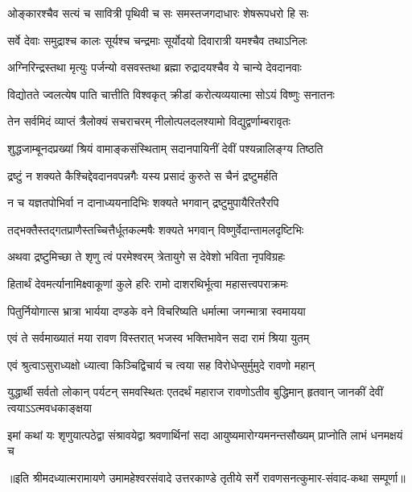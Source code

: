 \twolineshloka
{ओङ्कारश्चैव सत्यं च सावित्री पृथिवी च सः}
{समस्तजगदाधारः शेषरूपधरो हि सः} %

\twolineshloka
{सर्वे देवाः समुद्राश्च कालः सूर्यश्च चन्द्रमाः}
{सूर्योदयो दिवारात्री यमश्चैव तथाऽनिलः} %

\twolineshloka
{अग्निरिन्द्रस्तथा मृत्युः पर्जन्यो वसवस्तथा}
{ब्रह्मा रुद्रादयश्चैव ये चान्ये देवदानवाः} %

\twolineshloka
{विद्योतते ज्वलत्येष पाति चात्तीति विश्वकृत्}
{क्रीडां करोत्यव्ययात्मा सोऽयं विष्णुः सनातनः} %

\twolineshloka
{तेन सर्वमिदं व्याप्तं त्रैलोक्यं सचराचरम्}
{नीलोत्पलदलश्यामो विद्युद्वर्णाम्बरावृतः} %

\twolineshloka
{शुद्धजाम्बूनदप्रख्यां श्रियं वामाङ्कसंस्थिताम्}
{सदानपायिनीं देवीं पश्यन्नालिङ्ग्य तिष्ठति} %

\twolineshloka
{द्रष्टुं न शक्यते कैश्चिद्देवदानवपन्नगैः}
{यस्य प्रसादं कुरुते स चैनं द्रष्टुमर्हति} %

\twolineshloka
{न च यज्ञतपोभिर्वा न दानाध्ययनादिभिः}
{शक्यते भगवान् द्रष्टुमुपायैरितरैरपि} %

\twolineshloka
{तद्भक्तैस्तद्गतप्राणैस्तच्चित्तैर्धूतकल्मषैः}
{शक्यते भगवान् विष्णुर्वेदान्तामलदृष्टिभिः} %

\twolineshloka
{अथवा द्रष्टुमिच्छा ते शृणु त्वं परमेश्वरम्}
{त्रेतायुगे स देवेशो भविता नृपविग्रहः} %

\twolineshloka
{हितार्थं देवमर्त्यानामिक्ष्वाकूणां कुले हरिः}
{रामो दाशरथिर्भूत्वा महासत्त्वपराक्रमः} %

\twolineshloka
{पितुर्नियोगात्स भ्रात्रा भार्यया दण्डके वने}
{विचरिष्यति धर्मात्मा जगन्मात्रा स्वमायया} %

\twolineshloka
{एवं ते सर्वमाख्यातं मया रावण विस्तरात्}
{भजस्व भक्तिभावेन सदा रामं श्रिया युतम्} %


\twolineshloka
{एवं श्रुत्वाऽसुराध्यक्षो ध्यात्वा किञ्चिद्विचार्य च}
{त्वया सह विरोधेप्सुर्मुमुदे रावणो महान्} %

\threelineshloka
{युद्धार्थी सर्वतो लोकान् पर्यटन् समवस्थितः}
{एतदर्थं महाराज रावणोऽतीव बुद्धिमान्}
{हृतवान् जानकीं देवीं त्वयाऽऽत्मवधकाङ्क्षया} %

\fourlineindentedshloka
{इमां कथां यः शृणुयात्पठेद्वा}
{संश्रावयेद्वा श्रवणार्थिनां सदा}
{आयुष्यमारोग्यमनन्तसौख्यम्}
{प्राप्नोति लाभं धनमक्षयं च} %


{॥इति श्रीमदध्यात्मरामायणे उमामहेश्वरसंवादे उत्तरकाण्डे तृतीये  सर्गे 
रावणसनत्कुमार-संवाद-कथा सम्पूर्णा॥}
